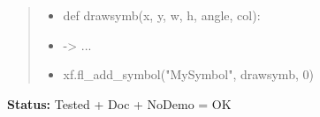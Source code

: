 \begin{boxedminipage}{\funcwidth}
\begin{quote}
\begin{itemize}
  \item
    \setlength{\parskip}{0.6ex}
def drawsymb(x, y, w, h, angle, col):



  \item {\textbar}-{\textgreater}{\textbar} ...



  \item xf.fl\_add\_symbol("MySymbol", drawsymb, 0)



\end{itemize}

\end{quote}

\textbf{Status:} Tested + Doc + NoDemo = OK



    \end{boxedminipage}

    \label{xformslib:flbasic:fl_draw_symbol}

    \vspace{0.5ex}

